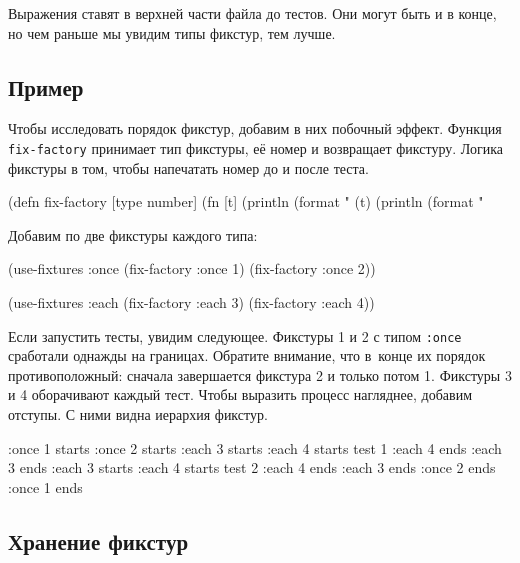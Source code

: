 Выражения ставят в верхней части файла до тестов. Они могут быть и в конце, но
чем раньше мы увидим типы фикстур, тем лучше.

\subsection{Пример}

Чтобы исследовать порядок фикстур, добавим в них побочный эффект. Функция
\verb|fix-factory| принимает тип фикстуры, её номер и возвращает
фикстуру. Логика фикстуры в том, чтобы напечатать номер до и после теста.


\begin{english}
  \begin{clojure}
(defn fix-factory [type number]
  (fn [t]
    (println (format "%
    (t)
    (println (format "%
  \end{clojure}
\end{english}

\noindent
Добавим по две фикстуры каждого типа:

\begin{english}
  \begin{clojure}
(use-fixtures :once
  (fix-factory :once 1)
  (fix-factory :once 2))

(use-fixtures :each
  (fix-factory :each 3)
  (fix-factory :each 4))
  \end{clojure}
\end{english}

Если запустить тесты, увидим следующее. Фикстуры 1 и 2 с типом \verb|:once|
сработали однажды на границах. Обратите внимание, что в~конце их порядок
противоположный: сначала завершается фикстура 2 и только потом 1. Фикстуры 3 и 4
оборачивают каждый тест. Чтобы выразить процесс нагляднее, добавим отступы. С
ними видна иерархия фикстур.


\begin{english}
  \begin{clojure}
:once 1 starts
  :once 2 starts
    :each 3 starts
      :each 4 starts
        test 1
      :each 4 ends
    :each 3 ends
    :each 3 starts
      :each 4 starts
        test 2
      :each 4 ends
    :each 3 ends
  :once 2 ends
:once 1 ends
  \end{clojure}
\end{english}

\subsection{Хранение фикстур}

